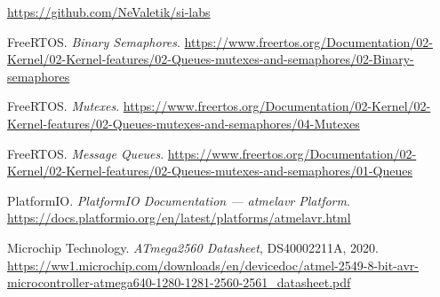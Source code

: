 \documentclass[12pt]{article}
\begin{document}
\begin{thebibliography}{}

  \url{https://github.com/NeValetik/si-labs}

  FreeRTOS. \textit{Binary Semaphores}.
  \url{https://www.freertos.org/Documentation/02-Kernel/02-Kernel-features/02-Queues-mutexes-and-semaphores/02-Binary-semaphores}

  FreeRTOS. \textit{Mutexes}.
  \url{https://www.freertos.org/Documentation/02-Kernel/02-Kernel-features/02-Queues-mutexes-and-semaphores/04-Mutexes}

  FreeRTOS. \textit{Message Queues}.
  \url{https://www.freertos.org/Documentation/02-Kernel/02-Kernel-features/02-Queues-mutexes-and-semaphores/01-Queues}

  PlatformIO. \textit{PlatformIO Documentation — atmelavr Platform}.
  \url{https://docs.platformio.org/en/latest/platforms/atmelavr.html}

  Microchip Technology. \textit{ATmega2560 Datasheet}, DS40002211A, 2020.
  \url{https://ww1.microchip.com/downloads/en/devicedoc/atmel-2549-8-bit-avr-microcontroller-atmega640-1280-1281-2560-2561_datasheet.pdf}

\end{thebibliography}
\endgroup

\pagebreak
\end{document}
